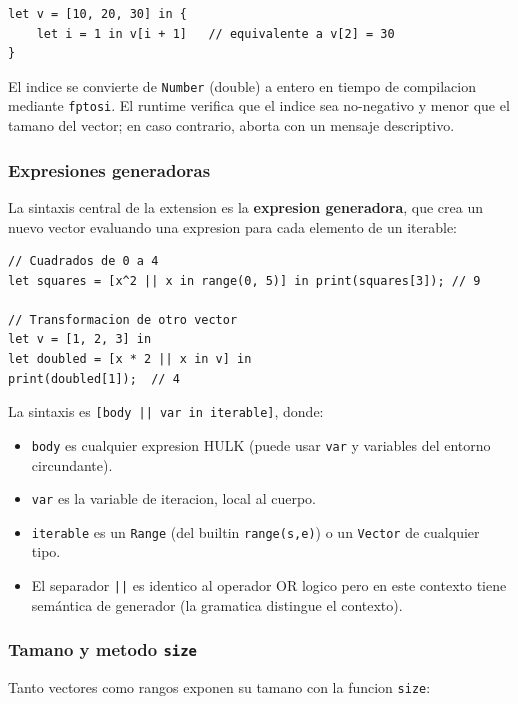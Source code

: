 \documentclass[12pt,a4paper]{article}
\begin{document}
\begin{lstlisting}[caption={Indexacion con expresion}]
let v = [10, 20, 30] in {
    let i = 1 in v[i + 1]   // equivalente a v[2] = 30
}
\end{lstlisting}

El indice se convierte de \texttt{Number} (double) a entero en tiempo de compilacion
mediante \texttt{fptosi}. El runtime verifica que el indice sea no-negativo y menor
que el tamano del vector; en caso contrario, aborta con un mensaje descriptivo.

\subsubsection{Expresiones generadoras}

La sintaxis central de la extension es la \textbf{expresion generadora}, que crea un
nuevo vector evaluando una expresion para cada elemento de un iterable:

\begin{lstlisting}[caption={Expresiones generadoras}]
// Cuadrados de 0 a 4
let squares = [x^2 || x in range(0, 5)] in print(squares[3]); // 9

// Transformacion de otro vector
let v = [1, 2, 3] in
let doubled = [x * 2 || x in v] in
print(doubled[1]);  // 4
\end{lstlisting}

La sintaxis es \texttt{[body || var in iterable]}, donde:
\begin{itemize}
  \item \texttt{body} es cualquier expresion HULK (puede usar \texttt{var} y
    variables del entorno circundante).
  \item \texttt{var} es la variable de iteracion, local al cuerpo.
  \item \texttt{iterable} es un \texttt{Range} (del builtin \texttt{range(s,e)})
    o un \texttt{Vector} de cualquier tipo.
  \item El separador \texttt{||} es identico al operador OR logico pero en este
    contexto tiene semántica de generador (la gramatica distingue el contexto).
\end{itemize}

\subsubsection{Tamano y metodo \texttt{size}}

Tanto vectores como rangos exponen su tamano con la funcion \texttt{size}:
\end{document}
